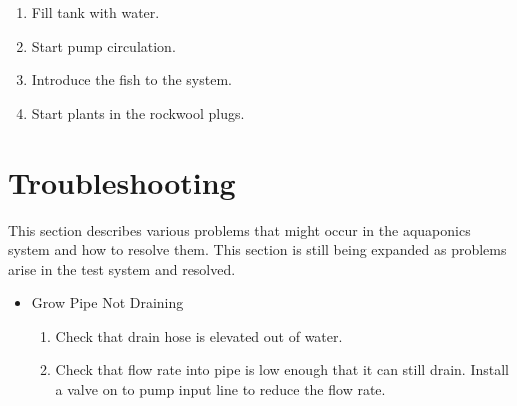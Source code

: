 \documentclass[american,12pt]{article}
\begin{document}
\begin{enumerate}
    \item Fill tank with water.
    \item Start pump circulation.
    \item Introduce the fish to the system.
    \item Start plants in the rockwool plugs.
\end{enumerate}

\section{Troubleshooting}
This section describes various problems that might occur in the 
aquaponics system and how to resolve them. This section is still
being expanded as problems arise in the test system and
resolved.

\begin{itemize}
	\item Grow Pipe Not Draining
	\begin{enumerate}
		\item Check that drain hose is elevated out of water.
		\item Check that flow rate into pipe is low enough that it can still 
			drain. Install a valve on to pump input line to reduce the flow 
			rate.
	\end{enumerate}
\end{itemize}

\newpage
\printbibliography
\end{document}
